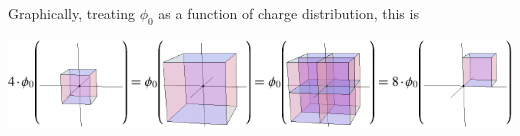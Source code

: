 \documentclass[solutions]{esg8022pset}
\begin{document}
  Graphically, treating $\phi_0$ as a function of charge distribution, this is
  \begin{center}\includegraphics[width=\textwidth]{ps02_sol_07}\end{center}
\end{document}
